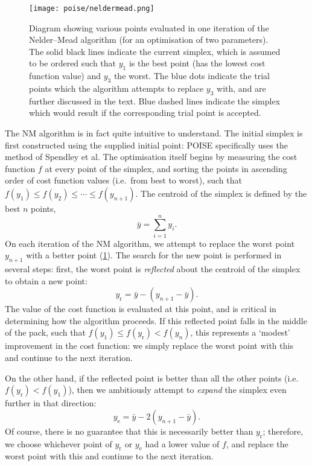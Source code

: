\begin{figure}[htb]
    \centering
    \texttt{[image: poise/neldermead.png]}%
    \caption[Trial points in an iteration of the Nelder--Mead algorithm]{
        Diagram showing various points evaluated in one iteration of the Nelder--Mead algorithm (for an optimisation of two parameters).
        The solid black lines indicate the current simplex, which is assumed to be ordered such that $y_1$ is the best point (has the lowest cost function value) and $y_3$ the worst.
        The blue dots indicate the trial points which the algorithm attempts to replace $y_3$ with, and are further discussed in the text.
        Blue dashed lines indicate the simplex which would result if the corresponding trial point is accepted.
    }
    \label{fig:neldermead}
\end{figure}

The NM algorithm is in fact quite intuitive to understand.
The initial simplex is first constructed using the supplied initial point: POISE specifically uses the method of Spendley et al.\autocite{Spendley1962T}
The optimisation itself begins by measuring the cost function $f$ at every point of the simplex, and sorting the points in ascending order of cost function values (i.e.\ from best to worst), such that $f(y_1) \leq f(y_2) \leq \cdots \leq f(y_{n+1})$.
The centroid of the simplex is defined by the best $n$ points,
\begin{equation}
    \label{eq:simplex_centroid}
    \bar{y} = \sum_{i=1}^n y_i.
\end{equation}
On each iteration of the NM algorithm, we attempt to replace the worst point $y_{n+1}$  with a better point (\cref{fig:neldermead}).
The search for the new point is performed in several steps: first, the worst point is \textit{reflected} about the centroid of the simplex to obtain a new point:
\begin{equation}
    \label{eq:nm_reflect}
    y_\text{r} = \bar{y} - (y_{n+1} - \bar{y}).
\end{equation}
The value of the cost function is evaluated at this point, and is critical in determining how the algorithm proceeds.
If this reflected point falls in the middle of the pack, such that $f(y_1) \leq f(y_\text{r}) < f(y_n)$, this represents a `modest' improvement in the cost function: we simply replace the worst point with this and continue to the next iteration.

On the other hand, if the reflected point is better than all the other points (i.e.\ $f(y_\text{r}) < f(y_1)$), then we ambitiously attempt to \textit{expand} the simplex even further in that direction:
\begin{equation}
    \label{eq:nm_expand}
    y_\text{e} = \bar{y} - 2(y_{n+1} - \bar{y}).
\end{equation}
Of course, there is no guarantee that this is necessarily better than $y_\text{r}$; therefore, we choose whichever point of $y_\text{r}$ or $y_\text{e}$ had a lower value of $f$, and replace the worst point with this and continue to the next iteration.

